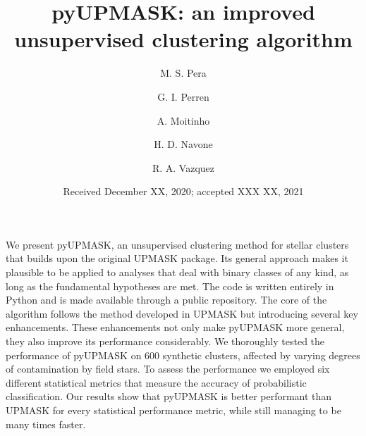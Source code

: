 \documentclass{aa}
\begin{document}
 


\title{pyUPMASK: an improved unsupervised clustering algorithm}

\author{M. S. Pera
\and
G. I. Perren
\and
A. Moitinho
\and
H. D. Navone
\and
R. A. Vazquez
}


\date{Received December XX, 2020; accepted XXX XX, 2021}

\abstract
  {}
  {We present pyUPMASK, an unsupervised clustering method for stellar clusters
  that builds upon the original UPMASK package. Its general approach makes it
  plausible to be applied to analyses that deal with binary classes of any kind,
  as long as the fundamental hypotheses are met.
  The code is written entirely in Python and is made available through a public
  repository.}
  {The core of the algorithm follows the method developed in UPMASK but
  introducing several key enhancements. These enhancements not only make
  pyUPMASK more general, they also improve its performance considerably.
  }
  {We thoroughly tested the performance of pyUPMASK on 600 synthetic clusters,
  affected by varying degrees of contamination by field stars. To assess the
  performance we employed six different statistical metrics that measure the
  accuracy of probabilistic classification.}
  {Our results show that pyUPMASK is better performant than UPMASK for every
  statistical performance metric, while still managing to be many times faster.
  }
\end{document}
